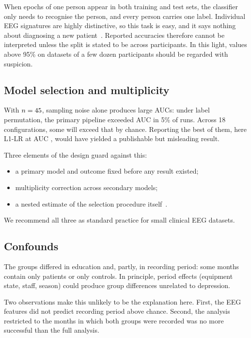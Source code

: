 When epochs of one person appear in both training and test sets, the classifier only needs to recognise the person,
and every person carries one label. Individual EEG signatures are highly distinctive, so this task is easy, and it says
nothing about diagnosing a new patient~\cite{saeb2017need,brookshire2024leakage}. Reported accuracies therefore cannot
be interpreted unless the split is stated to be across participants. In this light, values above 95\% on datasets of
a few dozen participants should be regarded with suspicion.

\subsection{Model selection and multiplicity}
With $n=45$, sampling noise alone produces large AUCs: under label permutation, the primary pipeline exceeded
AUC \PrimaryLrLAllNullQ{} in 5\% of runs. Across 18 configurations, some will exceed that by chance. Reporting the best of them, here L1-LR at AUC \LrLAllAuc, would have yielded a publishable but
misleading result.

Three elements of the design guard against this:
\begin{itemize}
  \item a primary model and outcome fixed before any result existed;
  \item multiplicity correction across secondary models;
  \item a nested estimate of the selection procedure itself~\cite{cawley2010overfitting}.
\end{itemize}
We recommend all three as standard practice for small clinical EEG datasets.

\subsection{Confounds}
The groups differed in education and, partly, in recording period: some months contain only patients or only
controls. In principle, period effects (equipment state, staff, season) could produce group differences unrelated to
depression.

Two observations make this unlikely to be the explanation here. First, the EEG features did not predict recording
period above chance. Second, the analysis restricted to the months in which both groups were recorded was no more
successful than the full analysis.

